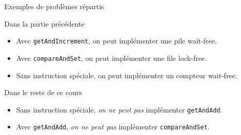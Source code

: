 
\begingroup

\begin{frame}[fragile]{Exemples de problèmes répartis}

  \begin{exampleblock}{Dans la partie précédente}
    \begin{itemize}
    \item Avec \lstinline{getAndIncrement}, on peut implémenter une pile wait-free.
    \item Avec \lstinline{compareAndSet}, on peut implémenter une file lock-free.
    \item Sans instruction spéciale, on peut implémenter un compteur wait-free.
    \end{itemize}
  \end{exampleblock}
  
  \begin{block}{Dans le reste de ce cours}
    \begin{itemize}
    \item Sans instruction spéciale, \emph{on ne peut pas} implémenter \lstinline{getAndAdd}.
    \item Avec \lstinline{getAndAdd}, \emph{on ne peut pas} implémenter \lstinline{compareAndSet}.
    \end{itemize}
  \end{block}

\end{frame}

\endgroup
\endinput

